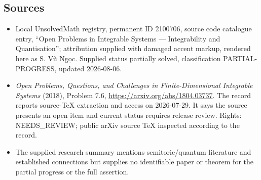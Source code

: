 \documentclass[11pt]{article}
\begin{document}
\subsection{Sources}
\begin{itemize}
\item Local UnsolvedMath registry, permanent ID 2100706, source code catalogue entry, ``Open Problems in Integrable Systems --- Integrability and Quantisation''; attribution supplied with damaged accent markup, rendered here as S. V\~u Ng\d{o}c. Supplied status partially solved, classification PARTIAL-PROGRESS, updated 2026-08-06.
\item \emph{Open Problems, Questions, and Challenges in Finite-Dimensional Integrable Systems} (2018), Problem 7.6, \url{https://arxiv.org/abs/1804.03737}. The record reports source-TeX extraction and access on 2026-07-29. It says the source presents an open item and current status requires release review. Rights: NEEDS\_REVIEW; public arXiv source TeX inspected according to the record.
\item The supplied research summary mentions semitoric/quantum literature and established connections but supplies no identifiable paper or theorem for the partial progress or the full assertion.
\end{itemize}
\end{document}

